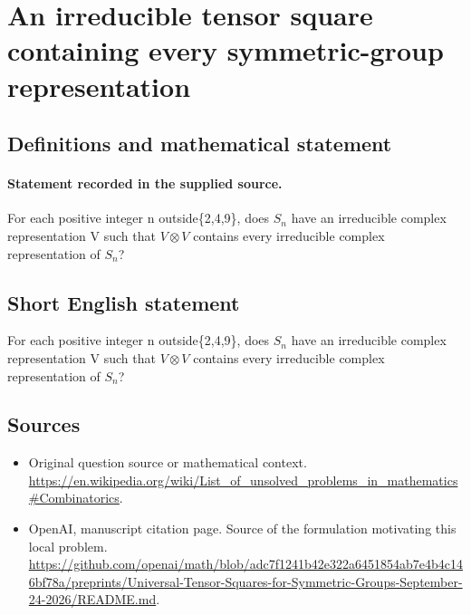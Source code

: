 \documentclass[11pt]{article}
\begin{document}
\section*{An irreducible tensor square containing every symmetric-group representation}\label{30007005}
\subsection{Definitions and mathematical statement}
\paragraph{Statement recorded in the supplied source.}
For each positive integer n outside\{2,4,9\}, does $S_{n}$ have an irreducible complex representation V such that $V\otimes V$ contains every irreducible complex representation of $S_{n}$?
\subsection{Short English statement}
For each positive integer n outside\{2,4,9\}, does $S_{n}$ have an irreducible complex representation V such that $V\otimes V$ contains every irreducible complex representation of $S_{n}$?
\subsection{Sources}
\begin{itemize}
\item[S1] Original question source or mathematical context.
\url{https://en.wikipedia.org/wiki/List_of_unsolved_problems_in_mathematics#Combinatorics}.
\item[S2] OpenAI, manuscript citation page. Source of the formulation motivating this local problem.
\url{https://github.com/openai/math/blob/adc7f1241b42e322a6451854ab7e4b4c146bf78a/preprints/Universal-Tensor-Squares-for-Symmetric-Groups-September-24-2026/README.md}.
\end{itemize}
\end{document}
